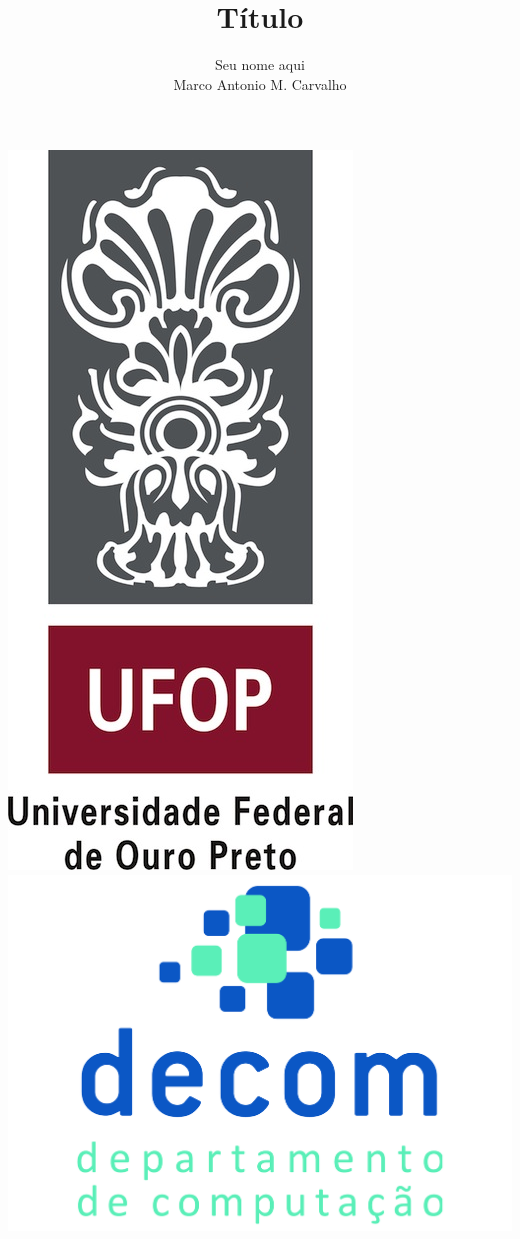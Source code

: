 \documentclass[xcolor=pdftex,dvipsnames,table]{beamer}
\begin{document}
\title[EVENTO]{Título}

\author[Marco Carvalho]{Seu nome aqui\\Marco Antonio M. Carvalho} 

\begin{frame}
  \titlepage
  \begin{center}
    \includegraphics[scale=0.15]{Figuras/Logomarca_jpg}
    \includegraphics[scale=0.09]{Figuras/logoDecom}
  \end{center}
\end{frame}
\end{document}
